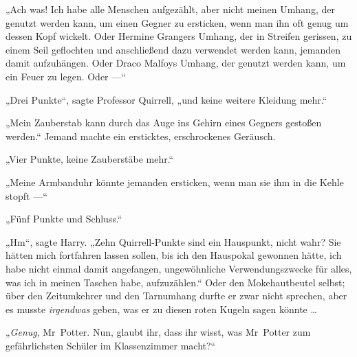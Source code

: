 „Ach was! Ich habe alle Menschen aufgezählt, aber nicht meinen Umhang, der genutzt werden kann, um einen Gegner zu ersticken, wenn man ihn oft genug um dessen Kopf wickelt. Oder Hermine Grangers Umhang, der in Streifen gerissen, zu einem Seil geflochten und anschließend dazu verwendet werden kann, jemanden damit aufzuhängen. Oder Draco Malfoys Umhang, der genutzt werden kann, um ein Feuer zu legen. Oder —“

„Drei Punkte“, sagte Professor Quirrell, „und keine weitere Kleidung mehr.“

„Mein Zauberstab kann durch das Auge ins Gehirn eines Gegners gestoßen werden.“ Jemand machte ein ersticktes, erschrockenes Geräusch.

„Vier Punkte, keine Zauberstäbe mehr.“

„Meine Armbanduhr könnte jemanden ersticken, wenn man sie ihm in die Kehle stopft —“

„Fünf Punkte und Schluss.“

„Hm“, sagte Harry.
„Zehn Quirrell-Punkte sind ein Hauspunkt, nicht wahr? Sie hätten mich fortfahren lassen sollen, bis ich den Hauspokal gewonnen hätte, ich habe nicht einmal damit angefangen, ungewöhnliche Verwendungszwecke für alles, was ich in meinen Taschen habe, aufzuzählen.“ Oder den Mokehautbeutel selbst; über den Zeitumkehrer und den Tarnumhang durfte er zwar nicht sprechen, aber es musste \emph{irgendwas} geben, was er zu diesen roten Kugeln sagen könnte …

„\emph{Genug}, Mr~Potter. Nun, glaubt ihr, dass ihr wisst, was Mr~Potter zum gefährlichsten Schüler im Klassenzimmer macht?“

